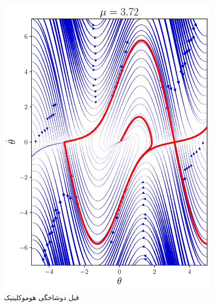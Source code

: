 \documentclass[12pt,a4paper]{article}
\begin{document}
	\begin{figure}[h!]
		\centering
		\includegraphics[width=\linewidth]{fig/8.4.4.mu3.72}
		\caption{قبل دوشاخگی هوموکلینیک}
	\end{figure}
\end{document}
